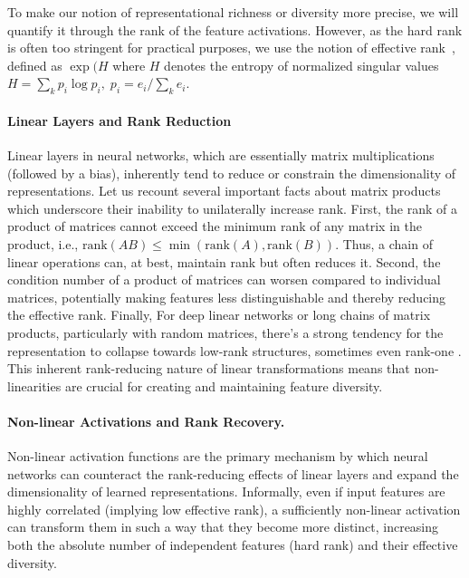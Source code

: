 \documentclass{article}
\newcommand{\GIU}[1]{\todo[color=purple!30,size=\tiny]{GIU: #1}}
\numberwithin{figure}{section}
\begin{document}
To make our notion of representational richness or diversity more precise, we will quantify it through the rank of the feature activations. However, as the hard rank is often too stringent for practical purposes, we use the notion of effective rank~\citep{dohare2024loss}, defined as $\exp(H$ where $H$ denotes the entropy of normalized singular values $H = \sum_k p_i \log p_i, \; p_i = e_i/\sum_k e_i.$ 



\paragraph{Linear Layers and Rank Reduction}
Linear layers in neural networks, which are essentially matrix multiplications (followed by a bias), inherently tend to reduce or constrain the dimensionality of representations. Let us recount several important facts about matrix products which underscore their inability to unilaterally increase rank. First, the rank of a product of matrices cannot exceed the minimum rank of any matrix in the product, i.e., $\mathrm{rank}(AB) \le \min(\mathrm{rank}(A), \mathrm{rank}(B))$. Thus, a chain of linear operations can, at best, maintain rank but often reduces it. Second, the condition number of a product of matrices can worsen compared to individual matrices, potentially making features less distinguishable and thereby reducing the effective rank. Finally,  For deep linear networks or long chains of matrix products, particularly with random matrices, there's a strong tendency for the representation to collapse towards low-rank structures, sometimes even rank-one \citep{saxe2014exact, furstenberg1963noncommuting}.
This inherent rank-reducing nature of linear transformations means that non-linearities are crucial for creating and maintaining feature diversity.

\paragraph{Non-linear Activations and Rank Recovery.}
Non-linear activation functions are the primary mechanism by which neural networks can counteract the rank-reducing effects of linear layers and expand the dimensionality of learned representations. Informally, even if input features are highly correlated (implying low effective rank), a sufficiently non-linear activation can transform them in such a way that they become more distinct, increasing both the absolute number of independent features (hard rank) and their effective diversity.
\end{document}
